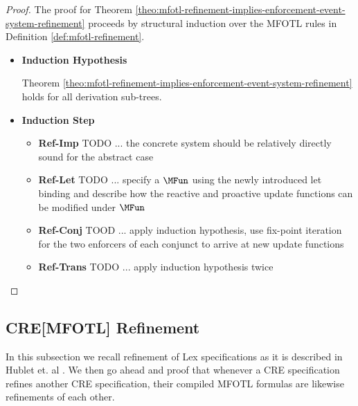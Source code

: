 \begin{proof}
    \label{proof:mfotl-refinement-implies-enforcement-event-system-refinement}
    The proof for Theorem
    \ref{theo:mfotl-refinement-implies-enforcement-event-system-refinement}
    proceeds by structural induction over the MFOTL rules in Definition
    \ref{def:mfotl-refinement}.

    \begin{itemize}
        \item \textbf{Induction Hypothesis}

        Theorem
        \ref{theo:mfotl-refinement-implies-enforcement-event-system-refinement}
        holds for all derivation sub-trees.

        \item \textbf{Induction Step}
        \begin{itemize}
            \item \textbf{Ref-Imp}
            TODO ... the concrete system should be relatively directly sound
            for the abstract case
            
            \item \textbf{Ref-Let}
            TODO ... specify a $\MFun$ using the newly introduced let binding
            and describe how the reactive and proactive update
            functions can be modified under $\MFun$
            
            \item \textbf{Ref-Conj}
            TOOD ... apply induction hypothesis,
            use fix-point iteration for the two enforcers of each conjunct
            to arrive at new update functions
            
            \item \textbf{Ref-Trans}
            TODO ... apply induction hypothesis twice
        \end{itemize}
    \end{itemize}
\end{proof}



\subsection{CRE[MFOTL] Refinement}
\label{subsection:refinement-of-cre-specifications}
In this subsection we recall refinement of Lex specifications as it is described in
Hublet et. al \cite{lex}. We then go ahead and proof that whenever a CRE
specification refines another CRE specification, their compiled MFOTL
formulas are likewise refinements of each other.

